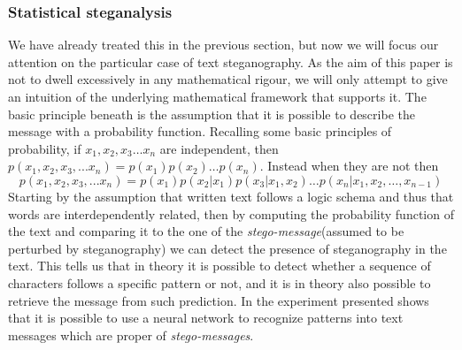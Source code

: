\documentclass[../../main.tex]{subfiles}
\begin{document}
\subsubsection{Statistical steganalysis}
We have already treated this in the previous section, but now we will focus
our attention on the particular case of text steganography.
As the aim of this paper is not to dwell excessively in any mathematical rigour,
we will only attempt to give an intuition of the underlying mathematical framework that supports it.
The basic principle beneath is the assumption that it is possible to
describe the message with a probability function.
Recalling some basic principles of probability, if
$ x_1, x_2, x_3 \dots x_n $ are independent, then
$ p(x_1, x_2, x_3, ... x_n) = p(x_1) p(x_2) \dots p(x_n)$. 
Instead when they are not then
$$ p(x_1, x_2, x_3, ... x_n) = p(x_1) p(x_2 | x_1) p(x_3 | x_1, x_2) \dots
p(x_n | x_1, x_2, \dots, x_{n-1}) $$
Starting by the assumption that written text follows a logic schema and thus
that words are interdependently related, then by computing the probability
function of the text and comparing it to the one of the
\emph{stego-message}(assumed to be perturbed by steganography) we can detect
the presence of steganography in the text. 
This tells us that in theory it is possible to detect whether a sequence of
characters follows a specific pattern or not, and it is in theory also
possible to retrieve the message from such prediction.
In \cite{fast-steg-method} the experiment presented shows that it is
possible to use a neural network to recognize patterns into text messages
which are proper of \emph{stego-messages}.
\end{document}
